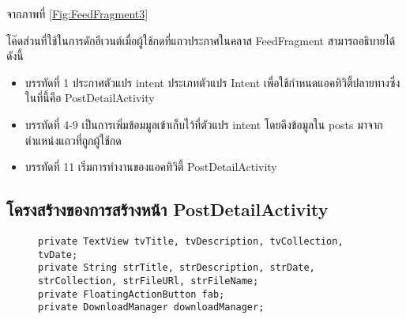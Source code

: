 	จากภาพที่ \ref{Fig:FeedFragment3}{โค๊ดส่วนที่ใช้ในการดักอีเวนต์เมื่อผู้ใช้กดที่แถวประกาศในคลาส FeedFragment สามารถอธิบายได้ดังนี้
	\begin{itemize}[label={--}]
		\item บรรทัดที่ 1 ประกาศตัวแปร intent ประเภทตัวแปร Intent เพื่อใช้กำหนดแอคทิวิตี้ปลายทางซึ่งในที่นี้คือ PostDetailActivity
		\item บรรทัดที่ 4-9 เป็นการเพิ่มข้อมมูลเข้าเก็บไว้ที่ตัวแปร intent โดยดึงข้อมูลใน posts มาจากตำแหน่งแถวที่ถูกผู้ใช้กด
		\item บรรทัดที่ 11 เริ่มการทำงานของแอคทิวิตี้ PostDetailActivity
	\end{itemize}

	\subsection{โครงสร้างของการสร้างหน้า PostDetailActivity}
	\begin{figure}[H]
		{\begin{lstlisting}
private TextView tvTitle, tvDescription, tvCollection, tvDate;
private String strTitle, strDescription, strDate, strCollection, strFileURl, strFileName;
private FloatingActionButton fab;
private DownloadManager downloadManager;


\end{lstlisting}}
\end{figure}}

